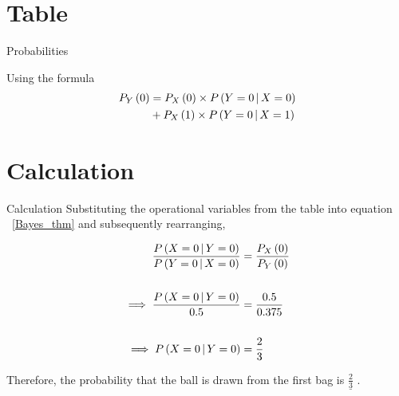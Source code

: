 \documentclass{beamer}
\begin{document}
	\section{Table}
		\begin{frame}{Probabilities}
	
			\begin{table}[h!b]
	
				\centering
				
		
				\label{table}
		
			\end{table}
	
			Using the formula
			\begin{align}
				P_{Y}\left(0\right) &= P_{X}\left(0\right) \times P\left(Y = 0 \operatorname*{|} X = 0\right) \nonumber \\
				&+ P_{X}\left(1\right) \times P\left(Y = 0 \operatorname*{|} X = 1\right)
					\label{prob_form}
			\end{align}

		\end{frame}

	\section{Calculation}
		\begin{frame}{Calculation}
			Substituting the operational variables from the table  into equation ~\eqref{Bayes_thm} and subsequently rearranging,
	
	
			\begin{align}
				\frac{P\left(X = 0 \operatorname*{|} Y = 0\right)}{P\left(Y = 0 \operatorname*{|} X = 0\right)} &= \frac{P_{X}\left(0\right)}{P_{Y}\left(0\right)} \\
					\nonumber \\
				\implies \frac{P\left(X = 0 \operatorname*{|} Y = 0\right)}{0.5} &= \frac{0.5}{0.375} \\
					\nonumber \\
				\implies P\left(X = 0 \operatorname*{|} Y = 0\right) &= \frac{2}{3}
					\label{soln}
			\end{align}
	
	
			Therefore, the probability that the ball is drawn from the first bag is $\underline{\frac{2}{3}}$ .
		\end{frame}
\end{document}
